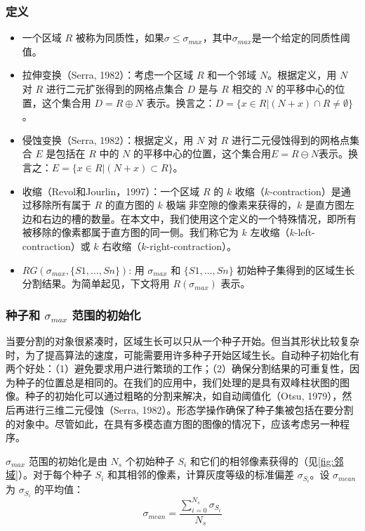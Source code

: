 \subsubsection{定义}
\begin{itemize}
    \item 一个区域 $R$ 被称为同质性，如果$\sigma \leq \sigma_{max}$，其中$\sigma_{max}$是一个给定的同质性阈值。
    \item 拉伸变换（Serra, 1982\cite{serra1982image}）：考虑一个区域 $R$ 和一个邻域 $N$。根据定义，用 $N$ 对 $R$ 进行二元扩张得到的网格点集合 $D$ 是与 $R$ 相交的 $N$ 的平移中心的位置，这个集合用 $D=R \oplus N$ 表示。换言之：$D=\{x \in R |(N+x) \cap R \neq \emptyset\}$。
    \item 侵蚀变换（Serra, 1982\cite{serra1982image}）：根据定义，用 $N$ 对 $R$ 进行二元侵蚀得到的网格点集合 $E$ 是包括在 $R$ 中的 $N$ 的平移中心的位置，这个集合用$E=R \ominus N$表示。换言之：$E=\{x \in R |(N+x) \subset R\}$。
    \item 收缩（Revol和Jourlin，1997\cite{revol1997new}）：一个区域 $R$ 的 $k$ 收缩（$k$-contraction）是通过移除所有属于 $R$ 的直方图的 $k$ 极端 非空隙的像素来获得的，$k$ 是直方图左边和右边的槽的数量。在本文中，我们使用这个定义的一个特殊情况，即所有被移除的像素都属于直方图的同一侧。我们称它为 $k$ 左收缩（$k$-left-contraction）或 $k$ 右收缩（$k$-right-contraction）。
    \item $RG(\sigma_{max}, \{S1,\dots,Sn\})$: 用 $\sigma_{max}$ 和 $\{S1,\dots,Sn\}$ 初始种子集得到的区域生长分割结果。为简单起见，下文将用 $R(\sigma_{max})$ 表示。
\end{itemize}

\subsubsection{种子和 $\sigma_{max}$ 范围的初始化}\label{sec:初始化}

当要分割的对象很紧凑时，区域生长可以只从一个种子开始。但当其形状比较复杂时，为了提高算法的速度，可能需要用许多种子开始区域生长。自动种子初始化有两个好处：（1）避免要求用户进行繁琐的工作；（2）确保分割结果的可重复性，因为种子的位置总是相同的。在我们的应用中，我们处理的是具有双峰柱状图的图像。种子的初始化可以通过粗略的分割来解决，如自动阈值化（Otsu, 1979\cite{otsu1979threshold}），然后再进行三维二元侵蚀（Serra, 1982\cite{serra1982image}）。形态学操作确保了种子集被包括在要分割的对象中。尽管如此，在具有多模态直方图的图像的情况下，应该考虑另一种程序。

$\sigma_{max}$ 范围的初始化是由 $N_s$ 个初始种子 $S_i$ 和它们的相邻像素获得的（见\cref{fig:邻域}）。对于每个种子 $S_i$ 和其相邻的像素，计算灰度等级的标准偏差 $\sigma_{S_i}$。设 $\sigma_{mean}$ 为 $\sigma_{S_i}$ 的平均值：
\begin{equation}
    \sigma_{mean}=\frac{\sum_{i = 0}^{N_s} \sigma_{S_i}}{N_s}
\end{equation}

